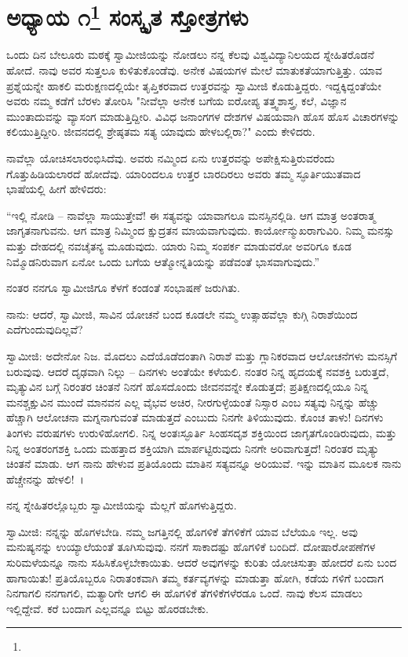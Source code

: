 
\chapter[ಅಧ್ಯಾಯ ೧]{ಅಧ್ಯಾಯ ೧\protect\footnote{} ಸಂಸ್ಕೃತ ಸ್ತೋತ್ರಗಳು}

ಒಂದು ದಿನ ಬೇಲೂರು ಮಠಕ್ಕೆ ಸ್ವಾಮೀಜಿಯನ್ನು ನೋಡಲು ನನ್ನ ಕೆಲವು ವಿಶ್ವವಿದ್ಯಾನಿಲಯದ ಸ್ನೇಹಿತರೊಡನೆ ಹೋದೆ. ನಾವು ಅವರ ಸುತ್ತಲೂ ಕುಳಿತುಕೊಂಡೆವು. ಅನೇಕ ವಿಷಯಗಳ ಮೇಲೆ ಮಾತುಕತೆಯಾಗುತ್ತಿತ್ತು. ಯಾವ ಪ್ರಶ್ನೆಯನ್ನೇ ಹಾಕಲಿ ಮರುಕ್ಷಣದಲ್ಲಿಯೇ ತೃಪ್ತಿಕರವಾದ ಉತ್ತರವನ್ನು ಸ್ವಾಮೀಜಿ ಕೊಡುತ್ತಿದ್ದರು. ಇದ್ದಕ್ಕಿದ್ದಂತೆಯೇ ಅವರು ನಮ್ಮ ಕಡೆಗೆ ಬೆರಳು ತೋರಿಸಿ "ನೀವೆಲ್ಲಾ ಅನೇಕ ಬಗೆಯ ಐರೋಪ್ಯ ತತ್ತ್ವಶಾಸ್ತ್ರ, ಕಲೆ, ವಿಜ್ಞಾನ ಮುಂತಾದುವನ್ನು ವ್ಯಾಸಂಗ ಮಾಡುತ್ತಿದ್ದೀರಿ. ವಿವಿಧ ಜನಾಂಗಗಳ ದೇಶಗಳ ವಿಷಯವಾಗಿ ಹೊಸ ಹೊಸ ವಿಚಾರಗಳನ್ನು ಕಲಿಯುತ್ತಿದ್ದೀರಿ. ಜೀವನದಲ್ಲಿ ಶ್ರೇಷ್ಠತಮ ಸತ್ಯ ಯಾವುದು ಹೇಳಬಲ್ಲಿರಾ?" ಎಂದು ಕೇಳಿದರು.

ನಾವೆಲ್ಲಾ ಯೋಚಿಸಲಾರಂಭಿಸಿದೆವು. ಅವರು ನಮ್ಮಿಂದ ಏನು ಉತ್ತರವನ್ನು ಅಪೇಕ್ಷಿಸುತ್ತಿರುವರೆಂದು ಗೊತ್ತುಹಿಡಿಯಲಾರದೆ ಹೋದೆವು. ಯಾರಿಂದಲೂ ಉತ್ತರ ಬಾರದಿರಲು ಅವರು ತಮ್ಮ ಸ್ಫೂರ್ತಿಯುತವಾದ ಭಾಷೆಯಲ್ಲಿ ಹೀಗೆ ಹೇಳಿದರು:

“ಇಲ್ಲಿ ನೋಡಿ – ನಾವೆಲ್ಲಾ ಸಾಯುತ್ತೇವೆ! ಈ ಸತ್ಯವನ್ನು ಯಾವಾಗಲೂ ಮನಸ್ಸಿನಲ್ಲಿಡಿ. ಆಗ ಮಾತ್ರ ಅಂತರಾತ್ಮ ಜಾಗೃತನಾಗುವನು. ಆಗ ಮಾತ್ರ ನಿಮ್ಮಿಂದ ಕ್ಷುದ್ರತನ ಮಾಯವಾಗುವುದು. ಕಾರ್ಯೋನ್ಮುಖರಾಗುವಿರಿ. ನಿಮ್ಮ ಮನಸ್ಸು ಮತ್ತು ದೇಹದಲ್ಲಿ ನವಚೈತನ್ಯ ಮೂಡುವುದು. ಯಾರು ನಿಮ್ಮ ಸಂಪರ್ಕ ಮಾಡುವರೋ ಅವರಿಗೂ ಕೂಡ ನಿಮ್ಮೊಡನಿರುವಾಗ ಏನೋ ಒಂದು ಬಗೆಯ ಆತ್ಮೋನ್ನತಿಯನ್ನು ಪಡೆವಂತೆ ಭಾಸವಾಗುವುದು.”

ನಂತರ ನನಗೂ ಸ್ವಾಮೀಜಿಗೂ ಕೆಳಗೆ ಕಂಡಂತೆ ಸಂಭಾಷಣೆ ಜರುಗಿತು.

ನಾನು: ಆದರೆ, ಸ್ವಾಮೀಜಿ, ಸಾವಿನ ಯೋಚನೆ ಬಂದ ಕೂಡಲೇ ನಮ್ಮ ಉತ್ಸಾಹವೆಲ್ಲಾ ಕುಗ್ಗಿ ನಿರಾಶೆಯಿಂದ ಎದೆಗುಂದುವುದಿಲ್ಲವೆ?

ಸ್ವಾಮೀಜಿ: ಅದೇನೋ ನಿಜ. ಮೊದಲು ಎದೆಯೊಡೆದಂತಾಗಿ ನಿರಾಶೆ ಮತ್ತು ಗ್ಲಾನಿಕರವಾದ ಆಲೋಚನೆಗಳು ಮನಸ್ಸಿಗೆ ಬರುವುವು. ಆದರೆ ದೃಢವಾಗಿ ನಿಲ್ಲು – ದಿನಗಳು ಅಂತೆಯೇ ಕಳೆಯಲಿ. ನಂತರ ನಿನ್ನ ಹೃದಯಕ್ಕೆ ನವಶಕ್ತಿ ಬರುತ್ತದೆ, ಮೃತ್ಯುವಿನ ಬಗ್ಗೆ ನಿರಂತರ ಚಿಂತನೆ ನಿನಗೆ ಹೊಸದೊಂದು ಜೀವನವನ್ನೇ ಕೊಡುತ್ತದೆ; ಪ್ರತಿಕ್ಷಣದಲ್ಲಿಯೂ ನಿನ್ನ ಮನಶ್ಚಕ್ಷುವಿನ ಮುಂದೆ ಮಾನವನ ಎಲ್ಲ ವೈಭವ ಅಚಿರ, ನೀರಗುಳ್ಳೆಯಂತೆ ನಿಸ್ಸಾರ ಎಂಬ ಸತ್ಯವು ನಿನ್ನನ್ನು ಹೆಚ್ಚು ಹೆಚ್ಚಾಗಿ ಆಲೋಚನಾ ಮಗ್ನನಾಗುವಂತೆ ಮಾಡುತ್ತದೆ ಎಂಬುದು ನಿನಗೇ ತಿಳಿಯುವುದು. ಕೊಂಚ ತಾಳು! ದಿನಗಳು ತಿಂಗಳು ವರುಷಗಳು ಉರುಳಿಹೋಗಲಿ. ನಿನ್ನ ಅಂತಃಸ್ಫೂರ್ತಿ ಸಿಂಹಸದೃಶ ಶಕ್ತಿಯಿಂದ ಜಾಗೃತಗೊಂಡಿರುವುದು, ಮತ್ತು ನಿನ್ನ ಅಂತರಂಗಶಕ್ತಿ ಒಂದು ಮಹತ್ತಾದ ಶಕ್ತಿಯಾಗಿ ಮಾರ್ಪಟ್ಟಿರುವುದು ನಿನಗೇ ಅರಿವಾಗುತ್ತದೆ! ನಿರಂತರ ಮೃತ್ಯು ಚಿಂತನೆ ಮಾಡು. ಆಗ ನಾನು ಹೇಳುವ ಪ್ರತಿಯೊಂದು ಮಾತಿನ ಸತ್ಯವನ್ನೂ ಅರಿಯುವೆ. ಇನ್ನು ಮಾತಿನ ಮೂಲಕ ನಾನು ಹೆಚ್ಚೇನನ್ನು ಹೇಳಲಿ!~।

ನನ್ನ ಸ್ನೇಹಿತರಲ್ಲೊಬ್ಬರು ಸ್ವಾಮೀಜಿಯನ್ನು ಮೆಲ್ಲಗೆ ಹೊಗಳುತ್ತಿದ್ದರು.

ಸ್ವಾಮೀಜಿ: ನನ್ನನ್ನು ಹೊಗಳಬೇಡಿ. ನಮ್ಮ ಜಗತ್ತಿನಲ್ಲಿ ಹೊಗಳಿಕೆ ತೆಗಳಿಕೆಗೆ ಯಾವ ಬೆಲೆಯೂ ಇಲ್ಲ. ಅವು ಮನುಷ್ಯನನ್ನು ಉಯ್ಯಾಲೆಯಂತೆ ತೂಗಿಸುವುವು. ನನಗೆ ಸಾಕಾದಷ್ಟು ಹೊಗಳಿಕೆ ಬಂದಿದೆ. ದೋಷಾರೋಪಣೆಗಳ ಸುರಿಮಳೆಯನ್ನೂ ನಾನು ಸಹಿಸಿಕೊಳ್ಳಬೇಕಾಯಿತು. ಆದರೆ ಅವುಗಳನ್ನು ಕುರಿತು ಯೋಚಿಸುತ್ತಾ ಹೋದರೆ ಏನು ಬಂದ ಹಾಗಾಯಿತು! ಪ್ರತಿಯೊಬ್ಬರೂ ನಿರಾತಂಕವಾಗಿ ತಮ್ಮ ಕರ್ತವ್ಯಗಳನ್ನು ಮಾಡುತ್ತಾ ಹೋಗಿ, ಕಡೆಯ ಗಳಿಗೆ ಬಂದಾಗ ನಿನಗಾಗಲಿ ನನಗಾಗಲಿ, ಮತ್ಯಾರಿಗೇ ಆಗಲಿ ಈ ಹೊಗಳಿಕೆ ತೆಗಳಿಕೆಗಳೆರಡೂ ಒಂದೆ. ನಾವು ಕೆಲಸ ಮಾಡಲು ಇಲ್ಲಿದ್ದೇವೆ. ಕರೆ ಬಂದಾಗ ಎಲ್ಲವನ್ನೂ ಬಿಟ್ಟು ಹೊರಡಬೇಕು.

